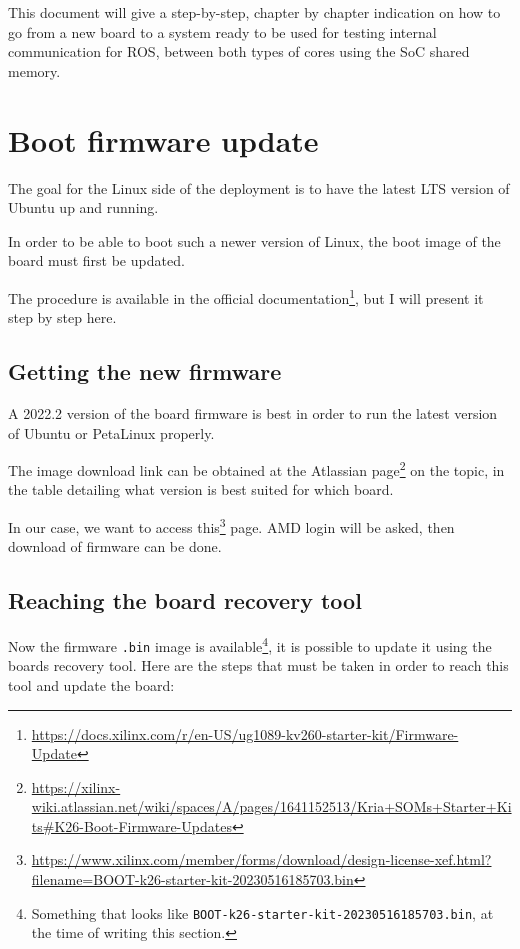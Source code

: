 \documentclass[10pt]{article}
\begin{document}
This document will give a step-by-step, chapter by chapter indication on how to go from a new board
to a system ready to be used for testing internal communication for ROS, between both types of cores
using the SoC shared memory.

\pagebreak
\section{Boot firmware update}
\label{sec:org614a047}
The goal for the Linux side of the deployment is to
have the latest LTS version of Ubuntu up and running.

In order to be able to boot such a newer version of Linux, the
boot image of the board must first be updated.

The procedure is available in the official documentation\footnote{\url{https://docs.xilinx.com/r/en-US/ug1089-kv260-starter-kit/Firmware-Update}},
but I will present it step by step here.

\subsection{Getting the new firmware}
\label{sec:orged43111}
A 2022.2 version of the board firmware is best in order to run the latest
version of Ubuntu or PetaLinux properly.

The image download link can be obtained at the Atlassian page\footnote{\url{https://xilinx-wiki.atlassian.net/wiki/spaces/A/pages/1641152513/Kria+SOMs+Starter+Kits\#K26-Boot-Firmware-Updates}} on the topic,
in the table detailing what version is best suited for which board.

In our case, we want to access this\footnote{\url{https://www.xilinx.com/member/forms/download/design-license-xef.html?filename=BOOT-k26-starter-kit-20230516185703.bin}} page. AMD login will be asked, then
download of firmware can be done.

\subsection{Reaching the board recovery tool}
\label{sec:org1f74c58}
Now the firmware \texttt{.bin} image is available\footnote{Something that looks like \texttt{BOOT-k26-starter-kit-20230516185703.bin}, at the time of writing this section.}, it is possible to update it using the
boards recovery tool. Here are the steps that must be taken in order to reach
this tool and update the board:
\end{document}
